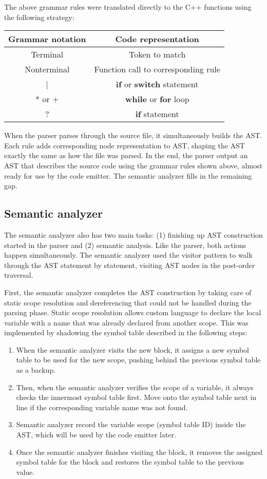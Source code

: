 \documentclass[manuscript,screen,nonacm]{acmart}
\begin{document}
The above grammar rules were translated directly to the C++ functions using the following strategy:

\begin{center}
\begin{tabular}{|c|c|}
    \hline
    Grammar notation & Code representation \\
    \hline
    Terminal & Token to match \\
    Nonterminal & Function call to corresponding rule \\
    | & \textbf{if} or \textbf{switch} statement \\
    * or + & \textbf{while} or \textbf{for} loop \\
    ? & \textbf{if} statement \\
    \hline
\end{tabular}
\end{center}

When the parser parses through the source file, it simultaneously builds the AST. Each rule adds corresponding node representation to AST, shaping the AST exactly the same as how the file was parsed. In the end, the parser output an AST that describes the source code using the grammar rules shown above, almost ready for use by the code emitter. The semantic analyzer fills in the remaining gap.


\subsection{Semantic analyzer}
The semantic analyzer also has two main tasks: (1) finishing up AST construction started in the parser and (2) semantic analysis. Like the parser, both actions happen simultaneously. The semantic analyzer used the visitor pattern to walk through the AST statement by statement, visiting AST nodes in the post-order traversal. 

First, the semantic analyzer completes the AST construction by taking care of static scope resolution and dereferencing that could not be handled during the parsing phase. Static scope resolution allows custom language to declare the local variable with a name that was already declared from another scope. This was implemented by shadowing the symbol table described in the following steps:
\begin{enumerate}
    \item When the semantic analyzer visits the new block, it assigns a new symbol table to be used for the new scope, pushing behind the previous symbol table as a backup.
    \item Then, when the semantic analyzer verifies the scope of a variable, it always checks the innermost symbol table first. Move onto the symbol table next in line if the corresponding variable name was not found.
    \item Semantic analyzer record the variable scope (symbol table ID) inside the AST, which will be used by the code emitter later.
    \item Once the semantic analyzer finishes visiting the block, it removes the assigned symbol table for the block and restores the symbol table to the previous value. 
\end{enumerate}
\end{document}
